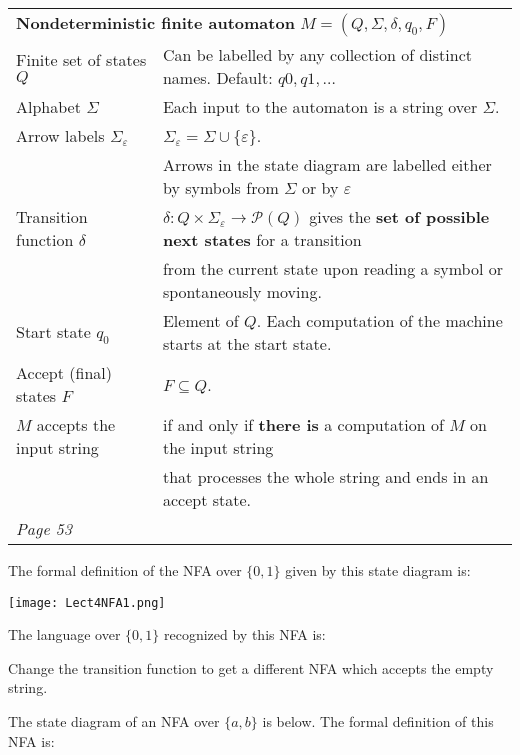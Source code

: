 \documentclass[12pt, oneside]{article}
\begin{document}
\begin{center}
\begin{tabular}{|ll|}
\hline
\multicolumn{2}{|l|}{{\bf Nondeterministic finite automaton} $M = (Q, \Sigma, \delta, q_0, F)$} \\
Finite set of states $Q$  & Can  be labelled by any collection  of distinct names. Default: $q0, q1, \ldots$  \\
Alphabet $\Sigma$ &  Each input to the automaton is a string over  $\Sigma$. \\
Arrow labels $\Sigma_\varepsilon$ &  $\Sigma_\varepsilon = \Sigma \cup \{ \varepsilon\}$. \\
&  Arrows 
in the state diagram are labelled either by symbols from $\Sigma$ or by $\varepsilon$ \\
Transition function $\delta$  & $\delta: Q \times \Sigma_{\varepsilon} \to \mathcal{P}(Q)$
gives the {\bf set of possible next states} for a transition \\
&  from the current state upon reading a symbol or spontaneously moving.\\
Start state $q_0$ & Element of $Q$.  Each computation of the machine starts at the  start  state.\\
Accept (final) states $F$ & $F \subseteq  Q$.\\
$M$ accepts the input string & if and only if {\bf there is} a computation of $M$ on the input string\\
&  that 
processes the whole string and ends in an
accept state.\\
\hline
{\it Page 53}& \\
\hline
\end{tabular}
\end{center}

The formal definition of the NFA over $\{0,1\}$ given by this state diagram is: 

\texttt{[image: Lect4NFA1.png]}

The language over $\{0,1\}$ recognized by this NFA is:

\vspace{70pt}

Change the transition function to get a different NFA which accepts
the empty string.


\newpage

The state diagram of an NFA over $\{a,b\}$ is below.  The formal definition of this NFA is:

\vspace{-30pt}
\end{document}
